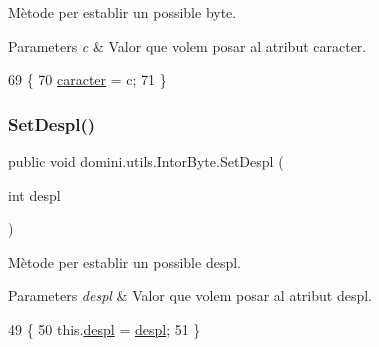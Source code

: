 Mètode per establir un possible byte. 


\begin{DoxyParams}{Parameters}
{\em c} & Valor que volem posar al atribut caracter. \\
\hline
\end{DoxyParams}

\begin{DoxyCode}
69    \{
70       \hyperlink{classdomini_1_1utils_1_1IntorByte_adbb2e8c31ead2f27d85ff39683b9a8a7}{caracter} = c;
71    \}
\end{DoxyCode}
\mbox{\label{classdomini_1_1utils_1_1IntorByte_a01c26f8a3a94b2bc31fda2f5989fca00}} 
\subsubsection{\texorpdfstring{Set\+Despl()}{SetDespl()}}
{\footnotesize\ttfamily public void domini.\+utils.\+Intor\+Byte.\+Set\+Despl (\begin{DoxyParamCaption}\item[{int}]{despl }\end{DoxyParamCaption})\hspace{0.3cm}{\ttfamily [inline]}}



Mètode per establir un possible despl. 


\begin{DoxyParams}{Parameters}
{\em despl} & Valor que volem posar al atribut despl. \\
\hline
\end{DoxyParams}

\begin{DoxyCode}
49    \{
50       this.\hyperlink{classdomini_1_1utils_1_1IntorByte_a83872b8acc9ab187acbc2175d5bf320e}{despl} = \hyperlink{classdomini_1_1utils_1_1IntorByte_a83872b8acc9ab187acbc2175d5bf320e}{despl};
51    \}
\end{DoxyCode}
\mbox{\label{classdomini_1_1utils_1_1IntorByte_a2371fca6d26baf4098466dbb3089052d}} 

